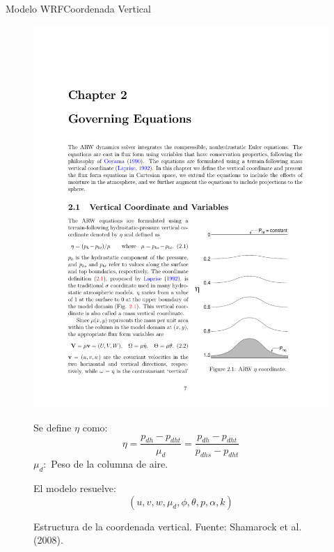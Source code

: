 \documentclass[mathserif,10pt]{beamer}
\begin{document}
\begin{frame}{Modelo WRF}{Coordenada Vertical}
	\begin{figure}[h!]
		\begin{minipage}{0.55\linewidth}
			\centering
			\includegraphics[width=0.95\linewidth,trim={11.5cm 3.3cm 1cm 14cm},clip]{fig/04/eta}
			\caption{Estructura de la coordenada vertical. Fuente: Shamarock et al. (2008).}
			\label{fig:04_eta}
		\end{minipage}%
		\begin{minipage}{0.45\linewidth}
			Se define $\eta$ como:
			\[ \eta = \frac{p_{dh}-p_{dht}}{\mu_d} = \frac{p_{dh}-p_{dht}}{p_{dhs}-p_{dht}} \]
			$\mu_d:$ Peso de la columna de aire.
			
			\bigskip
			\bigskip
			
			El modelo resuelve:\\
			\[(u,v,w,\mu_d,\phi, \theta,p,\alpha,k)\]
		\end{minipage}%
	\end{figure}
\end{frame}
\end{document}
